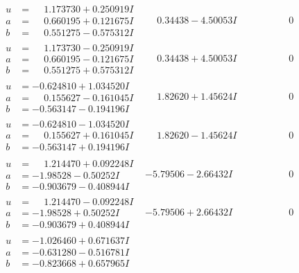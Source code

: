 \documentclass[1p]{elsarticle_modified}
\theoremstyle{definition}
\begin{document}
$$\begin{array}{c|c|c}
\begin{aligned}
u &= \phantom{-}1.173730 + 0.250919 I \\
a &= \phantom{-}0.660195 + 0.121675 I \\
b &= \phantom{-}0.551275 - 0.575312 I\end{aligned}
 & \phantom{-}0.34438 - 4.50053 I & \phantom{-0.000000 } 0 \\ \hline\begin{aligned}
u &= \phantom{-}1.173730 - 0.250919 I \\
a &= \phantom{-}0.660195 - 0.121675 I \\
b &= \phantom{-}0.551275 + 0.575312 I\end{aligned}
 & \phantom{-}0.34438 + 4.50053 I & \phantom{-0.000000 } 0 \\ \hline\begin{aligned}
u &= -0.624810 + 1.034520 I \\
a &= \phantom{-}0.155627 - 0.161045 I \\
b &= -0.563147 - 0.194196 I\end{aligned}
 & \phantom{-}1.82620 + 1.45624 I & \phantom{-0.000000 } 0 \\ \hline\begin{aligned}
u &= -0.624810 - 1.034520 I \\
a &= \phantom{-}0.155627 + 0.161045 I \\
b &= -0.563147 + 0.194196 I\end{aligned}
 & \phantom{-}1.82620 - 1.45624 I & \phantom{-0.000000 } 0 \\ \hline\begin{aligned}
u &= \phantom{-}1.214470 + 0.092248 I \\
a &= -1.98528 - 0.50252 I \\
b &= -0.903679 - 0.408944 I\end{aligned}
 & -5.79506 - 2.66432 I & \phantom{-0.000000 } 0 \\ \hline\begin{aligned}
u &= \phantom{-}1.214470 - 0.092248 I \\
a &= -1.98528 + 0.50252 I \\
b &= -0.903679 + 0.408944 I\end{aligned}
 & -5.79506 + 2.66432 I & \phantom{-0.000000 } 0 \\ \hline\begin{aligned}
u &= -1.026460 + 0.671637 I \\
a &= -0.631280 - 0.516781 I \\
b &= -0.823668 + 0.657965 I\end{aligned}

\end{array}$$
\end{document}
